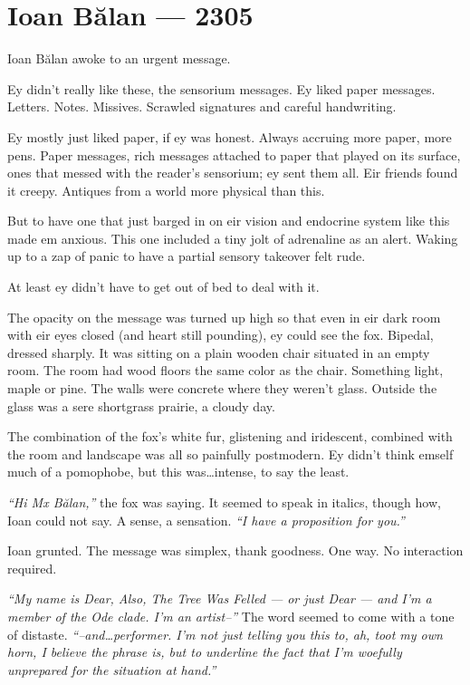 \hypertarget{ioan-bux103lan-2305}{%
\chapter*{Ioan Bălan — 2305}\label{ioan-bux103lan-2305}}

Ioan Bălan awoke to an urgent message.

Ey didn't really like these, the sensorium messages. Ey liked paper messages. Letters. Notes. Missives. Scrawled signatures and careful handwriting.

Ey mostly just liked paper, if ey was honest. Always accruing more paper, more pens. Paper messages, rich messages attached to paper that played on its surface, ones that messed with the reader's sensorium; ey sent them all. Eir friends found it creepy. Antiques from a world more physical than this.

But to have one that just barged in on eir vision and endocrine system like this made em anxious. This one included a tiny jolt of adrenaline as an alert. Waking up to a zap of panic to have a partial sensory takeover felt rude.

At least ey didn't have to get out of bed to deal with it.

The opacity on the message was turned up high so that even in eir dark room with eir eyes closed (and heart still pounding), ey could see the fox. Bipedal, dressed sharply. It was sitting on a plain wooden chair situated in an empty room. The room had wood floors the same color as the chair. Something light, maple or pine. The walls were concrete where they weren't glass. Outside the glass was a sere shortgrass prairie, a cloudy day.

The combination of the fox's white fur, glistening and iridescent, combined with the room and landscape was all so painfully postmodern. Ey didn't think emself much of a pomophobe, but this was\ldots{}intense, to say the least.

\emph{``Hi Mx Bălan,''} the fox was saying. It seemed to speak in italics, though how, Ioan could not say. A sense, a sensation. \emph{``I have a proposition for you.''}

Ioan grunted. The message was simplex, thank goodness. One way. No interaction required.

\emph{``My name is Dear, Also, The Tree Was Felled — or just Dear — and I'm a member of the Ode clade. I'm an artist--''} The word seemed to come with a tone of distaste. \emph{``--and\ldots{}performer. I'm not just telling you this to, ah, toot my own horn, I believe the phrase is, but to underline the fact that I'm woefully unprepared for the situation at hand.''}


